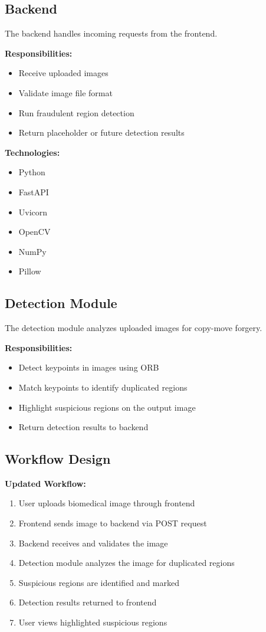 \documentclass[12pt]{article}
\begin{document}
\subsection{Backend}

The backend handles incoming requests from the frontend.

\textbf{Responsibilities:}
\begin{itemize}[noitemsep]
    \item Receive uploaded images
    \item Validate image file format
    \item Run fraudulent region detection
    \item Return placeholder or future detection results
\end{itemize}

\textbf{Technologies:}
\begin{itemize}[noitemsep]
    \item Python
    \item FastAPI
    \item Uvicorn
    \item OpenCV
    \item NumPy
    \item Pillow
\end{itemize}

\subsection{Detection Module}

The detection module analyzes uploaded images for copy-move forgery.

\textbf{Responsibilities:}
\begin{itemize}[noitemsep]
    \item Detect keypoints in images using ORB
    \item Match keypoints to identify duplicated regions
    \item Highlight suspicious regions on the output image
    \item Return detection results to backend
\end{itemize}

\subsection{Workflow Design}

\textbf{Updated Workflow:}
\begin{enumerate}[noitemsep]
    \item User uploads biomedical image through frontend
    \item Frontend sends image to backend via POST request
    \item Backend receives and validates the image
    \item Detection module analyzes the image for duplicated regions
    \item Suspicious regions are identified and marked
    \item Detection results returned to frontend
    \item User views highlighted suspicious regions
\end{enumerate}
\end{document}
